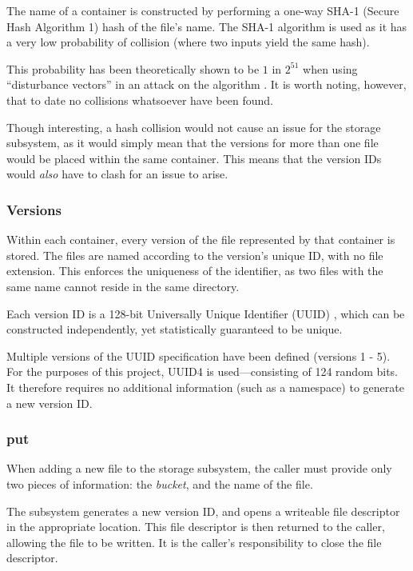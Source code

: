 The name of a container is constructed by performing a one-way SHA-1 (Secure
Hash Algorithm 1) \cite{rfc3174} hash of the file's name. The SHA-1 algorithm
is used as it has a very low probability of collision (where two inputs yield
the same hash).

This probability has been theoretically shown to be $1$ in $2^{51}$ when using
``disturbance vectors'' in an attack on the algorithm \cite{manuelSHA}. It is
worth noting, however, that to date no collisions whatsoever have been found.

Though interesting, a hash collision would not cause an issue for the storage
subsystem, as it would simply mean that the versions for more than one file
would be placed within the same container. This means that the version IDs
would \emph{also} have to clash for an issue to arise.

\subsubsection{Versions}
\label{sec:implementation-server-storage-versions}

Within each container, every version of the file represented by that container
is stored. The files are named according to the version's unique ID, with no
file extension. This enforces the uniqueness of the identifier, as two files
with the same name cannot reside in the same directory.

Each version ID is a 128-bit Universally Unique Identifier (UUID)
\cite{rfc4122}, which can be constructed independently, yet statistically
guaranteed to be unique.

Multiple versions of the UUID specification have been defined (versions 1 - 5).
For the purposes of this project, UUID4 is used---consisting of 124 random
bits. It therefore requires no additional information (such as a namespace) to
generate a new version ID.

\subsubsection{put}
\label{sec:implementation-server-storage-put}

When adding a new file to the storage subsystem, the caller must provide only
two pieces of information: the \emph{bucket}, and the name of the file.

The subsystem generates a new version ID, and opens a writeable file descriptor
in the appropriate location. This file descriptor is then returned to the
caller, allowing the file to be written. It is the caller's responsibility to
close the file descriptor.

